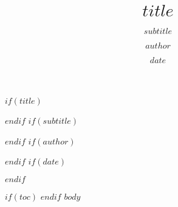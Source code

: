 \documentclass[letterpaper]{scrreprt}
\begin{document}
$if(title)$
\title{$title$}
$endif$
$if(subtitle)$
\subtitle{$subtitle$}
$endif$
$if(author)$
\author{$author$}
$endif$
$if(date)$
\date{$date$}
$endif$
\maketitle
$if(toc)$
\tableofcontents
$endif$
\clearpage
{} %
$body$
\end{document}
